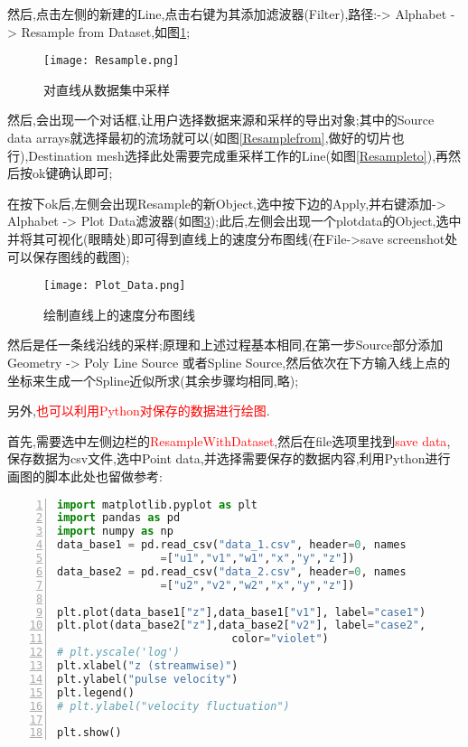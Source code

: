 然后,点击左侧的新建的Line,点击右键为其添加滤波器(Filter),路径:-> Alphabet -> Resample from Dataset,如图\ref{Resampledataset};\par

\begin{figure}[h]
	\noindent
	\centering
	\texttt{[image: Resample.png]}
	\caption{对直线从数据集中采样}
	\label{Resampledataset}
\end{figure}

然后,会出现一个对话框,让用户选择数据来源和采样的导出对象;其中的Source data arrays就选择最初的流场就可以(如图\ref{Resamplefrom},做好的切片也行),Destination mesh选择此处需要完成重采样工作的Line(如图\ref{Resampleto}),再然后按ok键确认即可;

\begin{figure}[H]
	\centering  %
	\label{Fig.main}
\end{figure}

在按下ok后,左侧会出现Resample的新Object,选中按下边的Apply,并右键添加-> Alphabet -> Plot Data滤波器(如图\ref{Plotdata});此后,左侧会出现一个plotdata的Object,选中并将其可视化(眼睛处)即可得到直线上的速度分布图线(在File->save screenshot处可以保存图线的截图);

\begin{figure}[h]
	\noindent
	\centering
	\texttt{[image: Plot\_Data.png]}
	\caption{绘制直线上的速度分布图线}
	\label{Plotdata}
\end{figure}

然后是任一条线沿线的采样;原理和上述过程基本相同,在第一步Source部分添加Geometry -> Poly Line Source 或者Spline Source,然后依次在下方输入线上点的坐标来生成一个Spline近似所求(其余步骤均相同,略);


另外,\textcolor{red}{也可以利用Python对保存的数据进行绘图}.\par
首先,需要选中左侧边栏的\textcolor{red}{ResampleWithDataset},然后在file选项里找到\textcolor{red}{save data},保存数据为csv文件,选中Point data,并选择需要保存的数据内容,利用Python进行画图的脚本此处也留做参考:


\begin{lstlisting}[numbers=left,frame=single,language=Python]
import matplotlib.pyplot as plt
import pandas as pd
import numpy as np
data_base1 = pd.read_csv("data_1.csv", header=0, names
				=["u1","v1","w1","x","y","z"])
data_base2 = pd.read_csv("data_2.csv", header=0, names
				=["u2","v2","w2","x","y","z"])

plt.plot(data_base1["z"],data_base1["v1"], label="case1")
plt.plot(data_base2["z"],data_base2["v2"], label="case2",
					       color="violet")
# plt.yscale('log')
plt.xlabel("z (streamwise)")
plt.ylabel("pulse velocity")
plt.legend()
# plt.ylabel("velocity fluctuation")

plt.show()
\end{lstlisting}
\par


